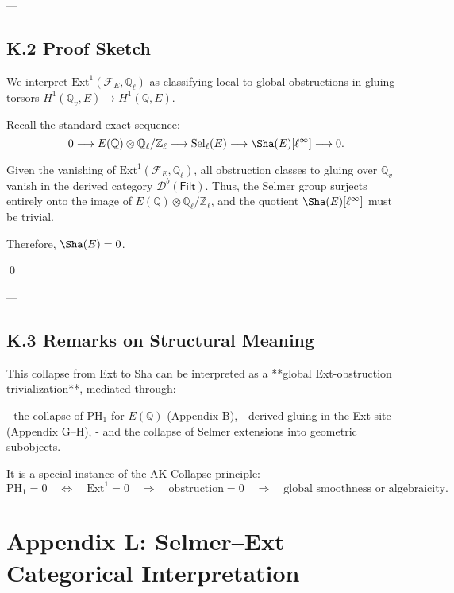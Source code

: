 ---

\subsection*{K.2 Proof Sketch}

We interpret \( \mathrm{Ext}^1(\mathcal{F}_E, \mathbb{Q}_\ell) \) as classifying local-to-global obstructions in gluing torsors \( H^1(\mathbb{Q}_v, E) \to H^1(\mathbb{Q}, E) \).  

Recall the standard exact sequence:
\[
0 \longrightarrow E(\mathbb{Q}) \otimes \mathbb{Q}_\ell/\mathbb{Z}_\ell \longrightarrow \mathrm{Sel}_\ell(E) \longrightarrow \Sha(E)[\ell^\infty] \longrightarrow 0.
\]

Given the vanishing of \( \mathrm{Ext}^1(\mathcal{F}_E, \mathbb{Q}_\ell) \), all obstruction classes to gluing over \( \mathbb{Q}_v \) vanish in the derived category \( \mathcal{D}^b(\mathsf{Filt}) \). Thus, the Selmer group surjects entirely onto the image of \( E(\mathbb{Q}) \otimes \mathbb{Q}_\ell/\mathbb{Z}_\ell \), and the quotient \( \Sha(E)[\ell^\infty] \) must be trivial.

Therefore, \( \Sha(E) = 0 \).

\qed

---

\subsection*{K.3 Remarks on Structural Meaning}

This collapse from Ext to Sha can be interpreted as a **global Ext-obstruction trivialization**, mediated through:

- the collapse of PH$_1$ for \( E(\mathbb{Q}) \) (Appendix B),
- derived gluing in the Ext-site (Appendix G–H),
- and the collapse of Selmer extensions into geometric subobjects.

It is a special instance of the AK Collapse principle:  
\[
\mathrm{PH}_1 = 0 \quad \Leftrightarrow \quad \mathrm{Ext}^1 = 0 \quad \Rightarrow \quad \text{obstruction} = 0 \quad \Rightarrow \quad \text{global smoothness or algebraicity}.
\]



\section*{Appendix L: Selmer--Ext Categorical Interpretation}

